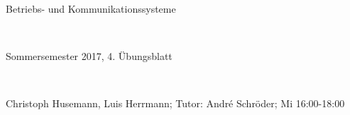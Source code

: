 \documentclass[numbers=noendperiod]{scrartcl}
\begin{document}
	
	\newcommand{\inputmintedframed}[2]{
		\begin{mdframed}[linecolor=bg,backgroundcolor=bg]
			\inputminted[mathescape,breaklines,linenos,numbersep=5pt,tabsize=3]{#1}{#2}
	\end{mdframed}}
	
	\hrulefill
	\begin{center}
		\bfseries %
		\sffamily %
		\begin{huge}
			Betriebs- und Kommunikationssysteme
		\end{huge}\\
		\begin{Large}
			Sommersemester 2017, 4. Übungsblatt
		\end{Large}\\
		\begin{small}
			Christoph Husemann, Luis Herrmann; Tutor: André Schröder; Mi 16:00-18:00
		\end{small}
		
		\vspace{-10pt}
	\end{center}
	\hrulefill
	
\end{document}
